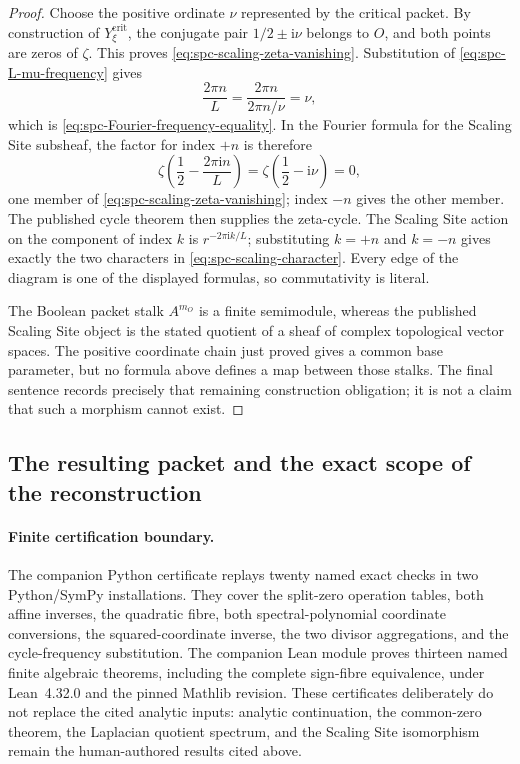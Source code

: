 \begin{proof}
Choose the positive ordinate \(\nu\) represented by the critical packet.
By construction of \(Y_\xi^{\mathrm{crit}}\), the conjugate pair
\(1/2\pm\mathrm i\nu\) belongs to \(O\), and both points are zeros of
\(\zeta\).  This proves \eqref{eq:spc-scaling-zeta-vanishing}.
Substitution of \eqref{eq:spc-L-mu-frequency} gives
\[
 \frac{2\pi n}{L}
 =
 \frac{2\pi n}{2\pi n/\nu}
 =\nu,
\]
which is \eqref{eq:spc-Fourier-frequency-equality}.  In the Fourier formula
for the Scaling Site subsheaf, the factor for index \(+n\) is therefore
\[
 \zeta\left(\frac12-\frac{2\pi\mathrm in}{L}\right)
 =
 \zeta\left(\frac12-\mathrm i\nu\right)=0,
\]
one member of \eqref{eq:spc-scaling-zeta-vanishing}; index \(-n\) gives the
other member.  The published cycle theorem then supplies the zeta-cycle.
The Scaling Site action on the component of index \(k\) is
\(r^{-2\pi\mathrm ik/L}\); substituting \(k=+n\) and \(k=-n\) gives
exactly the two characters in \eqref{eq:spc-scaling-character}.  Every edge
of the diagram is one of the displayed formulas, so commutativity is literal.

The Boolean packet stalk \(A^{m_O}\) is a finite semimodule, whereas the
published Scaling Site object is the stated quotient of a sheaf of complex
topological vector spaces.  The positive coordinate chain just proved gives
a common base parameter, but no formula above defines a map between those
stalks.  The final sentence records precisely that remaining construction
obligation; it is not a claim that such a morphism cannot exist.
\end{proof}

\subsection{The resulting packet and the exact scope of the reconstruction}

\paragraph{Finite certification boundary.}
The companion Python certificate replays twenty named exact checks
in two Python/SymPy installations.  They cover the split-zero operation tables,
both affine inverses, the quadratic fibre, both spectral-polynomial coordinate
conversions, the squared-coordinate inverse, the two divisor aggregations, and
the cycle-frequency substitution.  The companion Lean module proves thirteen
named finite algebraic
theorems, including the complete sign-fibre equivalence, under Lean~4.32.0 and
the pinned Mathlib revision.  These certificates deliberately do not replace
the cited analytic inputs: analytic continuation, the common-zero theorem, the
Laplacian quotient spectrum, and the Scaling Site isomorphism remain the
human-authored results cited above.

